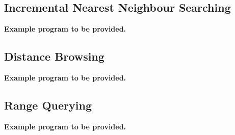 
\subsection{Incremental Nearest Neighbour Searching}

{\bf Example program to be provided.}

\subsection{Distance Browsing}

{\bf Example program to be provided.}

\subsection{Range Querying}

{\bf Example program to be provided.}
